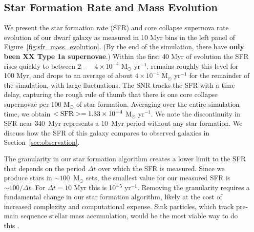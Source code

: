 \documentclass[twocolumn]{aastex61}
\begin{document}
\subsection{Star Formation Rate and Mass Evolution}
\label{sec:sfr}

We present the star formation rate (SFR) and core collapse supernova rate evolution of our dwarf galaxy as measured in 10 Myr bins in the left panel of Figure~\ref{fig:sfr_mass_evolution}. (By the end of the simulation, there have \textbf{only been XX Type 1a supernovae}.) Within the first 40 Myr of evolution the SFR rises quickly to between $2--4 \times 10^{-4}$ M$_{\odot}$ yr$^{-1}$, remains roughly this level for 100 Myr, and drops to an average of about $4 \times 10^{-4}$ M$_{\odot}$ yr$^{-1}$ for the remainder of the simulation, with large fluctuations. The SNR tracks the SFR with a time delay, capturing the rough rule of thumb that there is one core collapse supernovae per 100 M$_{\odot}$ of star formation. Averaging over the entire simulation time, we obtain  $<\rm{SFR}> = 1.33 \times 10^{-4}$ M$_{\odot}$ yr$^{-1}$. We note the discontinuity in SFR near 340~Myr represents a 10~Myr period without any star formation. We discuss how the SFR of this galaxy compares to observed galaxies in Section~\ref{sec:observation}.

The granularity in our star formation algorithm creates a lower limit to the SFR that depends on the period $\Delta t$ over which the SFR is measured. Since we produce stars in $\sim 100$~M$_{\odot}$ sets, the smallest value for our measured SFR is $\sim 100/ \Delta t$. For $\Delta t = 10$ Myr this is 10$^{-5}$ yr$^{-1}$. Removing the granularity requires a fundamental change in our star formation algorithm, likely at the cost of increased complexity and computational expense. Sink particles, which track pre-main sequence stellar mass accumulation, would be the most viable way to do this \citep[see for example ][]{Krumholz2004,Federrath2010,GongOstriker2013,BleulerTeyssier2014,Sormani2017}.
\end{document}
